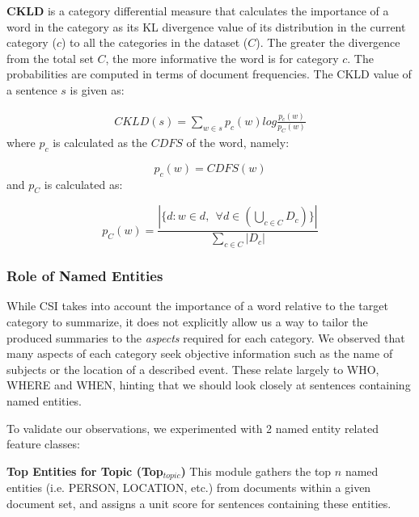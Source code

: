 \textbf{CKLD} is a category differential measure that calculates the importance of a word in the category as its KL divergence value of its distribution in the current category ($c$) to all the categories in the dataset ($C$). The greater the divergence from the total set $C$, the more informative the word is for category $c$. The probabilities are computed in terms of document frequencies. The CKLD value of a sentence $s$ is given as:

\begin{eqnarray*}
CKLD(s)= \sum_{w \in s}p_{c}(w)log\frac{p_{c}(w)}{p_{C}(w)}
\end{eqnarray*}
where $p_c$ is calculated as the $CDFS$ of the word, namely:

\begin{displaymath}
p_{c}(w) = CDFS(w)
\end{displaymath}
and $p_C$ is calculated as:

\begin{displaymath}
p_C(w) = \frac{ | \{d:w \in d, ~~\forall d \in (\bigcup_{c \in C} D_c )\} | }{\sum_{c \in C}|D_{c}|}
\end{displaymath}

\subsubsection{Role of Named Entities}
\label{sysoverview:ne}
While CSI takes into account the importance of a word relative to the target category to summarize, it does not explicitly allow us a way to tailor the produced summaries to the {\it aspects} required for each category. We observed that many aspects of each category seek objective information such as the name of subjects or the location of a described event. These relate largely to WHO, WHERE and WHEN, hinting that we should look closely at sentences containing named entities.

To validate our observations, we experimented with 2 named entity related feature classes:

\textbf{Top Entities for Topic (Top$_{topic}$)} This module gathers the top $n$ named entities (i.e. PERSON, LOCATION, etc.) from documents within a given document set, and assigns a unit score for sentences containing these entities.

